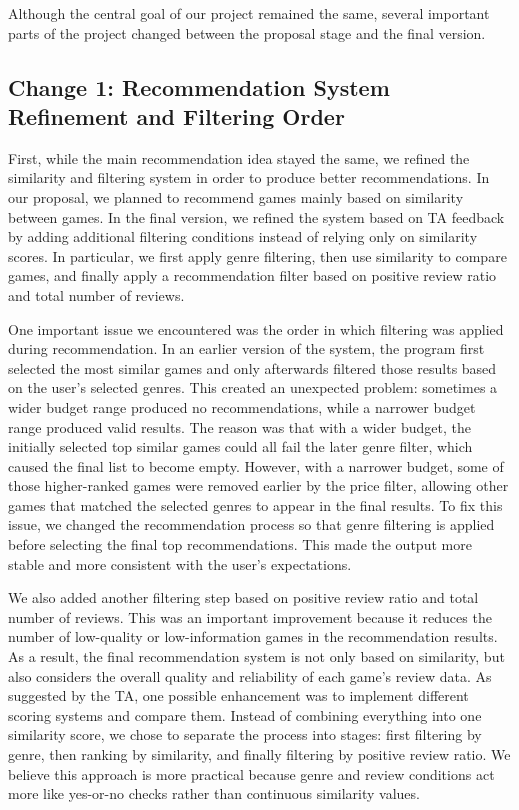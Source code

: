\documentclass[fontsize=11pt]{article}
\begin{document}
Although the central goal of our project remained the same, several important parts of the project changed between the proposal stage and the final version. 

\subsection*{Change 1: Recommendation System Refinement and Filtering Order}

First, while the main recommendation idea stayed the same, we refined the similarity and filtering system in order to produce better recommendations. In our proposal, we planned to recommend games mainly based on similarity between games. In the final version, we refined the system based on TA feedback by adding additional filtering conditions instead of relying only on similarity scores. In particular, we first apply genre filtering, then use similarity to compare games, and finally apply a recommendation filter based on positive review ratio and total number of reviews.

One important issue we encountered was the order in which filtering was applied during recommendation. In an earlier version of the system, the program first selected the most similar games and only afterwards filtered those results based on the user’s selected genres. This created an unexpected problem: sometimes a wider budget range produced no recommendations, while a narrower budget range produced valid results. The reason was that with a wider budget, the initially selected top similar games could all fail the later genre filter, which caused the final list to become empty. However, with a narrower budget, some of those higher-ranked games were removed earlier by the price filter, allowing other games that matched the selected genres to appear in the final results. To fix this issue, we changed the recommendation process so that genre filtering is applied before selecting the final top recommendations. This made the output more stable and more consistent with the user’s expectations.

We also added another filtering step based on positive review ratio and total number of reviews. This was an important improvement because it reduces the number of low-quality or low-information games in the recommendation results. As a result, the final recommendation system is not only based on similarity, but also considers the overall quality and reliability of each game’s review data. As suggested by the TA, one possible enhancement was to implement different scoring systems and compare them. Instead of combining everything into one similarity score, we chose to separate the process into stages: first filtering by genre, then ranking by similarity, and finally filtering by positive review ratio. We believe this approach is more practical because genre and review conditions act more like yes-or-no checks rather than continuous similarity values.
\end{document}
